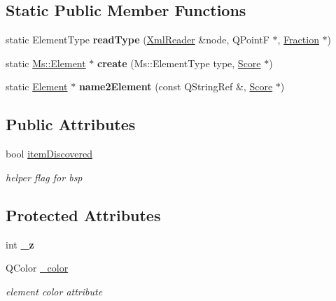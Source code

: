 \subsection*{Static Public Member Functions}
\begin{DoxyCompactItemize}
\item 
\mbox{\label{class_ms_1_1_element_a4422ccd59c2a9759591e15e290d3afdb}} 
static Element\+Type {\bfseries read\+Type} (\hyperlink{class_ms_1_1_xml_reader}{Xml\+Reader} \&node, Q\+PointF $\ast$, \hyperlink{class_ms_1_1_fraction}{Fraction} $\ast$)
\item 
\mbox{\label{class_ms_1_1_element_a0e94278fa705e7ee020dd9b652d1bced}} 
static \hyperlink{class_ms_1_1_element}{Ms\+::\+Element} $\ast$ {\bfseries create} (Ms\+::\+Element\+Type type, \hyperlink{class_ms_1_1_score}{Score} $\ast$)
\item 
\mbox{\label{class_ms_1_1_element_a3b88a2b00074559aad9b8948eaf07a6f}} 
static \hyperlink{class_ms_1_1_element}{Element} $\ast$ {\bfseries name2\+Element} (const Q\+String\+Ref \&, \hyperlink{class_ms_1_1_score}{Score} $\ast$)
\end{DoxyCompactItemize}
\subsection*{Public Attributes}
\begin{DoxyCompactItemize}
\item 
\mbox{\label{class_ms_1_1_element_a07c3b2ed980bf10d79c377a68f7c500d}} 
bool \hyperlink{class_ms_1_1_element_a07c3b2ed980bf10d79c377a68f7c500d}{item\+Discovered}
\begin{DoxyCompactList}\small\item\em helper flag for bsp \end{DoxyCompactList}\end{DoxyCompactItemize}
\subsection*{Protected Attributes}
\begin{DoxyCompactItemize}
\item 
\mbox{\label{class_ms_1_1_element_a833151435bfcef81ea589f9e8fc3154b}} 
int {\bfseries \+\_\+z}
\item 
\mbox{\label{class_ms_1_1_element_a85687d7e7b049c00327023c7306cec14}} 
Q\+Color \hyperlink{class_ms_1_1_element_a85687d7e7b049c00327023c7306cec14}{\+\_\+color}
\begin{DoxyCompactList}\small\item\em element color attribute \end{DoxyCompactList}\end{DoxyCompactItemize}


